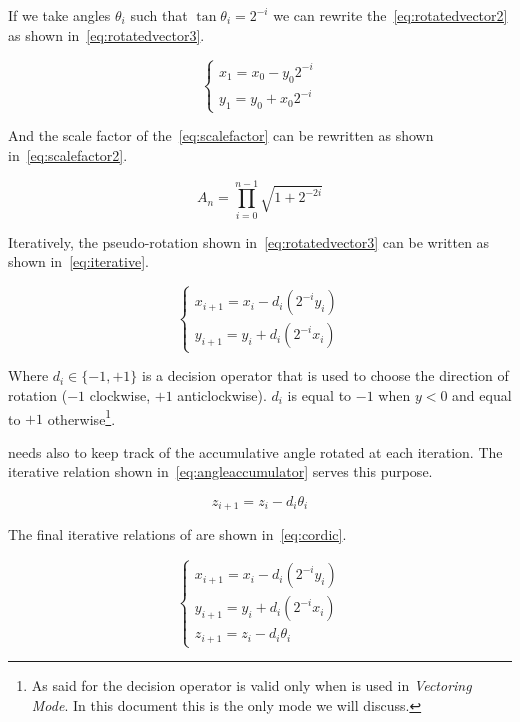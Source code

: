 If we take angles \(\theta_i\) such that \(\tan\theta_i = 2^{-i}\) we can
rewrite the~\eqref{eq:rotatedvector2} as shown in~\eqref{eq:rotatedvector3}.

\begin{equation}\label{eq:rotatedvector3}
	\begin{cases}
		x_1 = x_0 - y_0 2^{-i}\\
		y_1 = y_0 + x_0 2^{-i}
	\end{cases}
\end{equation}

And the scale factor of the~\eqref{eq:scalefactor} can be rewritten as shown
in~\eqref{eq:scalefactor2}.

\begin{equation}\label{eq:scalefactor2}
	A_n = \prod_{i=0}^{n-1} \sqrt{1 + 2^{-2i}}
\end{equation}

Iteratively, the pseudo-rotation shown in~\eqref{eq:rotatedvector3} can be
written as shown in~\eqref{eq:iterative}.

\begin{equation}\label{eq:iterative}
	\begin{cases}
		x_{i+1} = x_i - d_i(2^{-i}y_i)\\
		y_{i+1} = y_i + d_i(2^{-i}x_i)
	\end{cases}
\end{equation}

Where \(d_i \in \{-1, +1\}\) is a decision operator that is used to choose the
direction of rotation (\(-1\) clockwise, \(+1\) anticlockwise). \(d_i\) is equal
to \(-1\) when \(y < 0\) and equal to \(+1\) otherwise\footnote{As said for the
decision operator is valid only when \cordic{} is used in \emph{Vectoring
Mode}. In this document this is the only mode we will discuss.}.

\cordic{} needs also to keep track of the accumulative angle rotated at each
iteration. The iterative relation shown in~\eqref{eq:angleaccumulator} serves
this purpose.

\begin{equation}\label{eq:angleaccumulator}
	z_{i+1} = z_i - d_i\theta_i
\end{equation}

The final iterative relations of \cordic{} are shown in~\eqref{eq:cordic}.

\begin{equation}\label{eq:cordic}
	\begin{cases}
		x_{i+1} = x_i - d_i(2^{-i}y_i)\\
		y_{i+1} = y_i + d_i(2^{-i}x_i)\\
		z_{i+1} = z_i - d_i\theta_i
	\end{cases}
\end{equation}

